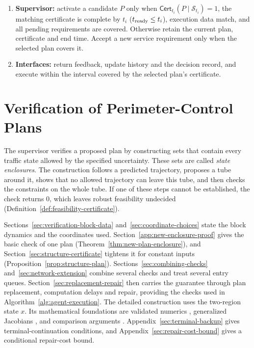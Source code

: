 \documentclass[final]{cas-sc}
\theoremstyle{definition}
\theoremstyle{plain}
\theoremstyle{definition}
\theoremstyle{plain}
\newcommand{\appref}[1]{Appendix~\ref{#1}}
\begin{document}
\begin{algorithm}[!htbp]
\begin{minipage}{\linewidth}
\begin{enumerate}
\eqref{eq:portfolio-cover-rule}. After rejection, invoke repair only if
requested by the agent or enabled automatically. Check every repair
and its backup under the same conditions.
\item\label{step:installation} \textbf{Supervisor:} activate a
candidate $P$ only when $\mathsf{Cert}_{t_i}(P\mid\mathcal S_{t_i})=1$,
the matching certificate is complete by $t_i$
($t_{\rm ready}\le t_i$), execution data match, and all pending
requirements are covered. Otherwise retain the current plan,
certificate and end time. Accept a new service requirement only when
the selected plan covers it.
\item\label{step:feedback} \textbf{Interfaces:} return feedback, update history and the
decision record, and execute within the interval covered by the
selected plan's certificate.
\end{enumerate}
\end{minipage}
\end{algorithm}

\section{Verification of Perimeter-Control Plans}
\label{sec:new-certification}

The supervisor verifies a proposed plan by constructing sets that
contain every traffic state allowed by the specified uncertainty. These
sets are called \emph{state enclosures}. The construction follows a
predicted trajectory, proposes a tube around it, shows that no allowed
trajectory can leave this tube, and then checks the constraints on the
whole tube. If one of these steps cannot be established, the check
returns $0$, which leaves robust feasibility undecided
(Definition~\ref{def:feasibility-certificate}).

Sections~\ref{sec:verification-block-data} and~\ref{sec:coordinate-choices} state the
block dynamics and the coordinates used. Section~\ref{app:new-enclosure-proof}
gives the basic check of one plan (Theorem~\ref{thm:new-plan-enclosure}), and
Section~\ref{sec:structure-certificate} tightens it for constant inputs
(Proposition~\ref{prop:structure-plan}). Sections~\ref{sec:combining-checks}
and~\ref{sec:network-extension} combine several checks and treat several
entry queues. Section~\ref{sec:replacement-repair} then carries the
guarantee through plan replacement, computation delays and repair,
providing the checks used in Algorithm~\ref{alg:agent-execution}.
The detailed construction uses the two-region state $x$. Its
mathematical foundations are validated numerics
\cite{tucker2011validated}, generalized Jacobians
\cite{clarke1990optimization}, and comparison arguments
\cite{khalil2002nonlinear,farina2000positive}. \appref{sec:terminal-backup}
gives terminal-continuation conditions, and \appref{sec:repair-cost-bound}
gives a conditional repair-cost bound.
\end{document}
